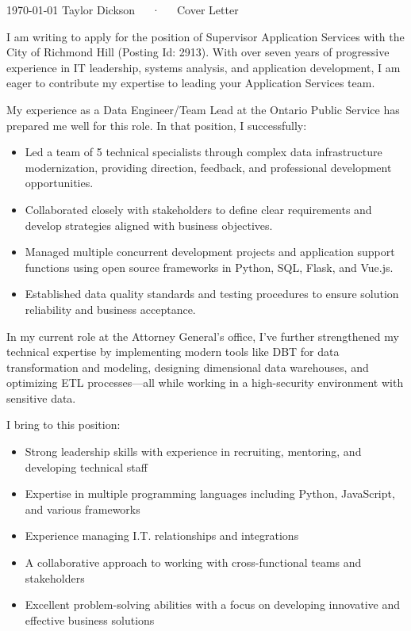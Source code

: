 \documentclass[11pt, letterpaper]{awesome-cv}
\begin{document}
\makecvheader[R]

\makecvfooter%
  {\today}
  {Taylor Dickson~~~·~~~Cover Letter}
  {}

\makelettertitle%

\begin{cvletter}
I am writing to apply for the position of Supervisor Application Services with the City of Richmond Hill (Posting Id: 2913). With over seven years of progressive experience in IT leadership, systems analysis, and application development, I am eager to contribute my expertise to leading your Application Services team.

My experience as a Data Engineer/Team Lead at the Ontario Public Service has prepared me well for this role. In that position, I successfully:
\begin{itemize}
  \item Led a team of 5 technical specialists through complex data infrastructure modernization, providing direction, feedback, and professional development opportunities.
  \item Collaborated closely with stakeholders to define clear requirements and develop strategies aligned with business objectives.
  \item Managed multiple concurrent development projects and application support functions using open source frameworks in Python, SQL, Flask, and Vue.js.
  \item Established data quality standards and testing procedures to ensure solution reliability and business acceptance.
\end{itemize}
In my current role at the Attorney General's office, I've further strengthened my technical expertise by implementing modern tools like DBT for data transformation and modeling, designing dimensional data warehouses, and optimizing ETL processes—all while working in a high-security environment with sensitive data.

I bring to this position:
\begin{itemize}
  \item Strong leadership skills with experience in recruiting, mentoring, and developing technical staff
  \item Expertise in multiple programming languages including Python, JavaScript, and various frameworks
  \item Experience managing I.T. relationships and integrations
  \item A collaborative approach to working with cross-functional teams and stakeholders
  \item Excellent problem-solving abilities with a focus on developing innovative and effective business solutions
\end{itemize}



\end{cvletter}
\end{document}
